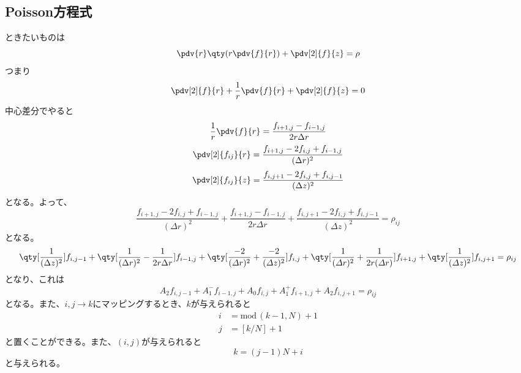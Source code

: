 \documentclass[a4paper,11pt,titlepage,uplatex]{jsarticle}
\begin{document}
\subsection{Poisson方程式}
ときたいものは
\begin{equation}
  \pdv{r}\qty(r\pdv{f}{r}) + \pdv[2]{f}{z}  = \rho
\end{equation}
つまり
\begin{equation}
  \pdv[2]{f}{r} + \frac{1}{r}\pdv{f}{r} + \pdv[2]{f}{z} = 0
\end{equation}
中心差分でやると
\begin{equation}
  \frac{1}{r}\pdv{f}{r} = \frac{f_{i+1,j}-f_{i-1,j}}{2r\Delta r}
\end{equation}
\begin{equation}
  \pdv[2]{f_{ij}}{r} = \frac{f_{i+1,j}-2f_{i,j}+f_{i-1,j}}{(\Delta r)^2}
\end{equation}
\begin{equation}
  \pdv[2]{f_{ij}}{z} = \frac{f_{i,j+1}-2f_{i,j}+f_{i,j-1}}{(\Delta z)^2}
\end{equation}
となる。よって、
\begin{equation}
  \frac{f_{i+1,j}-2f_{i,j}+f_{i-1,j}}{(\Delta r)^2} 
  +\frac{f_{i+1,j}-f_{i-1,j}}{2r\Delta r}
  +\frac{f_{i,j+1}-2f_{i,j}+f_{i,j-1}}{(\Delta z)^2} = \rho_{ij}
\end{equation}
となる。
\begin{equation}
  \qty[\frac{1}{(\Delta z)^2}]f_{i,j-1}+\qty[\frac{1}{(\Delta r)^2}-\frac{1}{2r\Delta r}]f_{i-1,j} + \qty[\frac{-2}{(\varDelta r)^2} + \frac{-2}{(\varDelta z)^2}]f_{i,j}
  + \qty[\frac{1}{(\varDelta r)^2} + \frac{1}{2r(\varDelta r)}]f_{i+1,j} + \qty[\frac{1}{(\varDelta z)^2}]f_{i,j+1} = \rho_{ij}
\end{equation}
となり、これは
\begin{equation}
  A_{2}f_{i,j-1}+A_{1}^{-}f_{i-1,j} + A_0f_{i,j} + A_{1}^{+}f_{i+1,j} + A_{2}f_{i,j+1} = \rho_{ij}
\end{equation}
となる。また、$i,j\to k$にマッピングするとき、$k$が与えられると
\begin{align}
  i &= \mathrm{mod}\,(k-1,N)+1 \\
  j &= [k/N]+1 
\end{align}
と置くことができる。また、$(i,j)$が与えられると
\begin{equation}
  k = (j-1)N + i
\end{equation}
と与えられる。
\end{document}
